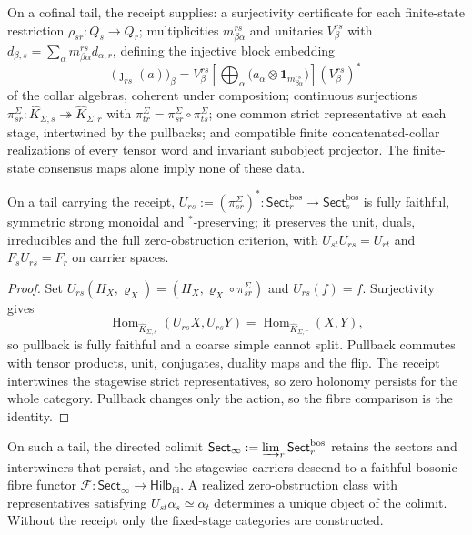 \documentclass[11pt]{article}
\begin{document}
\begin{definition}
On a cofinal tail, the receipt supplies: a surjectivity certificate for each
finite-state restriction \(\rho_{sr}:Q_s\to Q_r\); multiplicities
\(m_{\beta\alpha}^{rs}\) and unitaries \(V_\beta^{rs}\) with
\(d_{\beta,s}=\sum_\alpha m_{\beta\alpha}^{rs}d_{\alpha,r}\), defining the
injective block embedding
\[
\bigl(\jmath_{rs}(a)\bigr)_\beta
=V_\beta^{rs}\left[\bigoplus_\alpha
\bigl(a_\alpha\otimes\mathbf 1_{m_{\beta\alpha}^{rs}}\bigr)\right](V_\beta^{rs})^*
\]
of the collar algebras, coherent under composition; continuous surjections
\(\pi_{sr}^{\Sigma}:\widehat K_{\Sigma,s}\twoheadrightarrow\widehat K_{\Sigma,r}\)
with \(\pi_{tr}^{\Sigma}=\pi_{sr}^{\Sigma}\circ\pi_{ts}^{\Sigma}\); one common
strict representative at each stage, intertwined by the pullbacks; and
compatible finite concatenated-collar realizations of every tensor word and
invariant subobject projector. The finite-state consensus maps alone imply
none of these data.
\end{definition}

\begin{theorem}
On a tail carrying the receipt, \(U_{rs}:=(\pi_{sr}^{\Sigma})^*:
\mathsf{Sect}^{\mathrm{bos}}_r\to\mathsf{Sect}^{\mathrm{bos}}_s\) is fully
faithful, symmetric strong monoidal and \(^*\)-preserving; it preserves the
unit, duals, irreducibles and the full zero-obstruction criterion, with
\(U_{st}U_{rs}=U_{rt}\) and \(F_sU_{rs}=F_r\) on carrier spaces.
\end{theorem}

\begin{proof}
Set \(U_{rs}(H_X,\varrho_X)=(H_X,\varrho_X\circ\pi_{sr}^{\Sigma})\) and
\(U_{rs}(f)=f\). Surjectivity gives
\[
\operatorname{Hom}_{\widehat K_{\Sigma,s}}(U_{rs}X,U_{rs}Y)
=\operatorname{Hom}_{\widehat K_{\Sigma,r}}(X,Y),
\]
so pullback is fully
faithful and a coarse simple cannot split. Pullback commutes with tensor
products, unit, conjugates, duality maps and the flip. The receipt intertwines
the stagewise strict representatives, so zero holonomy persists for the whole
category. Pullback changes only the action, so the fibre comparison is the
identity.
\end{proof}

On such a tail, the directed colimit
\(\mathsf{Sect}_\infty:=\varinjlim_r\mathsf{Sect}^{\mathrm{bos}}_r\) retains
the sectors and intertwiners that persist, and the stagewise carriers descend
to a faithful bosonic fibre functor
\(\mathcal F:\mathsf{Sect}_\infty\to\mathsf{Hilb}_{\mathrm{fd}}\). A realized
zero-obstruction class with representatives satisfying
\(U_{st}\alpha_s\simeq\alpha_t\) determines a unique object of the colimit.
Without the receipt only the fixed-stage categories are constructed.
\end{document}
